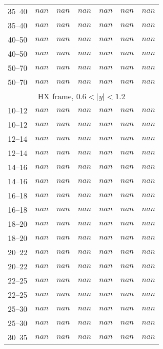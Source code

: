 \documentclass{article}
\begin{document}
\begin{table}[!h]
\begin{tabular}{|c|cccccc|}
35--40   &  $nan$  & $nan$  &  $nan$ &  $nan$  & $nan$  &  $nan$ \\
35--40   &  $nan$  & $nan$  &  $nan$ &  $nan$  & $nan$  &  $nan$ \\
40--50   &  $nan$  & $nan$  &  $nan$ &  $nan$  & $nan$  &  $nan$ \\
40--50   &  $nan$  & $nan$  &  $nan$ &  $nan$  & $nan$  &  $nan$ \\
50--70   &  $nan$  & $nan$  &  $nan$ &  $nan$  & $nan$  &  $nan$ \\
50--70   &  $nan$  & $nan$  &  $nan$ &  $nan$  & $nan$  &  $nan$ \\
\hline \multicolumn{7}{|c|}{HX frame, $0.6 < |y| < 1.2$}\\ \hline \rule{0pt}{4mm}
10--12   &  $nan$  & $nan$  &  $nan$ &  $nan$  & $nan$  &  $nan$ \\
10--12   &  $nan$  & $nan$  &  $nan$ &  $nan$  & $nan$  &  $nan$ \\
12--14   &  $nan$  & $nan$  &  $nan$ &  $nan$  & $nan$  &  $nan$ \\
12--14   &  $nan$  & $nan$  &  $nan$ &  $nan$  & $nan$  &  $nan$ \\
14--16   &  $nan$  & $nan$  &  $nan$ &  $nan$  & $nan$  &  $nan$ \\
14--16   &  $nan$  & $nan$  &  $nan$ &  $nan$  & $nan$  &  $nan$ \\
16--18   &  $nan$  & $nan$  &  $nan$ &  $nan$  & $nan$  &  $nan$ \\
16--18   &  $nan$  & $nan$  &  $nan$ &  $nan$  & $nan$  &  $nan$ \\
18--20   &  $nan$  & $nan$  &  $nan$ &  $nan$  & $nan$  &  $nan$ \\
18--20   &  $nan$  & $nan$  &  $nan$ &  $nan$  & $nan$  &  $nan$ \\
20--22   &  $nan$  & $nan$  &  $nan$ &  $nan$  & $nan$  &  $nan$ \\
20--22   &  $nan$  & $nan$  &  $nan$ &  $nan$  & $nan$  &  $nan$ \\
22--25   &  $nan$  & $nan$  &  $nan$ &  $nan$  & $nan$  &  $nan$ \\
22--25   &  $nan$  & $nan$  &  $nan$ &  $nan$  & $nan$  &  $nan$ \\
25--30   &  $nan$  & $nan$  &  $nan$ &  $nan$  & $nan$  &  $nan$ \\
25--30   &  $nan$  & $nan$  &  $nan$ &  $nan$  & $nan$  &  $nan$ \\
30--35   &  $nan$  & $nan$  &  $nan$ &  $nan$  & $nan$  &  $nan$ \\

\end{tabular}
\end{table}
\end{document}
